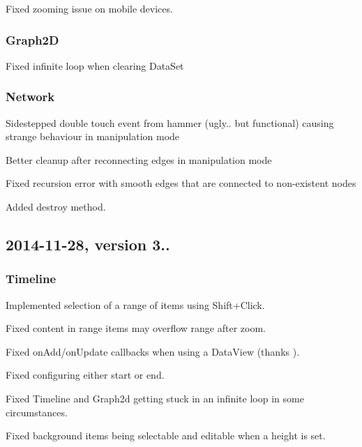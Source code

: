 \begin{DoxyItemize}
\item Fixed zooming issue on mobile devices.
\end{DoxyItemize}

\subsubsection*{Graph2D}


\begin{DoxyItemize}
\item Fixed infinite loop when clearing Data\+Set
\end{DoxyItemize}

\subsubsection*{Network}


\begin{DoxyItemize}
\item Sidestepped double touch event from hammer (ugly.. but functional) causing strange behaviour in manipulation mode
\item Better cleanup after reconnecting edges in manipulation mode
\item Fixed recursion error with smooth edges that are connected to non-\/existent nodes
\item Added destroy method.
\end{DoxyItemize}

\subsection*{2014-\/11-\/28, version 3..}

\subsubsection*{Timeline}


\begin{DoxyItemize}
\item Implemented selection of a range of items using Shift+\+Click.
\item Fixed content in range items may overflow range after zoom.
\item Fixed on\+Add/on\+Update callbacks when using a Data\+View (thanks ).
\item Fixed configuring either {\ttfamily start} or {\ttfamily end}.
\item Fixed Timeline and Graph2d getting stuck in an infinite loop in some circumstances.
\item Fixed background items being selectable and editable when a height is set.
\end{DoxyItemize}

